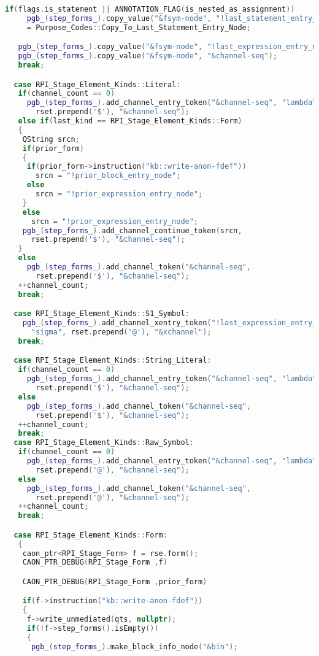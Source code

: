 \begin{lstlisting}[language = C++, numbers = none, escapechar = !,
    basicstyle = \ttfamily\bfseries\scriptsize, linewidth = .9\linewidth]
   if(flags.is_statement || ANNOTATION_FLAG(is_nested_as_assignment))
     pgb_(step_forms_).copy_value("&fsym-node", "!last_statement_entry_node")
     = Purpose_Codes::Copy_To_Last_Statement_Entry_Node;

   pgb_(step_forms_).copy_value("&fsym-node", "!last_expression_entry_node");
   pgb_(step_forms_).copy_value("&fsym-node", "&channel-seq");
   break;

  case RPI_Stage_Element_Kinds::Literal:
   if(channel_count == 0)
     pgb_(step_forms_).add_channel_entry_token("&channel-seq", "lambda",
       rset.prepend('$'), "&channel-seq");
   else if(last_kind == RPI_Stage_Element_Kinds::Form)
   {
    QString srcn;
    if(prior_form)
    {
     if(prior_form->instruction("kb::write-anon-fdef"))
       srcn = "!prior_block_entry_node";
     else
       srcn = "!prior_expression_entry_node";
    }
    else
      srcn = "!prior_expression_entry_node";
    pgb_(step_forms_).add_channel_continue_token(srcn,
      rset.prepend('$'), "&channel-seq");
   }
   else
     pgb_(step_forms_).add_channel_token("&channel-seq",
       rset.prepend('$'), "&channel-seq");
   ++channel_count;
   break;

  case RPI_Stage_Element_Kinds::S1_Symbol:
    pgb_(step_forms_).add_channel_xentry_token("!last_expression_entry_node",
      "sigma", rset.prepend('@'), "&xchannel");
   break;

  case RPI_Stage_Element_Kinds::String_Literal:
   if(channel_count == 0)
     pgb_(step_forms_).add_channel_entry_token("&channel-seq", "lambda",
       rset.prepend('$'), "&channel-seq");
   else
     pgb_(step_forms_).add_channel_token("&channel-seq",
       rset.prepend('$'), "&channel-seq");
   ++channel_count;
   break;
  case RPI_Stage_Element_Kinds::Raw_Symbol:
   if(channel_count == 0)
     pgb_(step_forms_).add_channel_entry_token("&channel-seq", "lambda",
       rset.prepend('@'), "&channel-seq");
   else
     pgb_(step_forms_).add_channel_token("&channel-seq",
       rset.prepend('@'), "&channel-seq");
   ++channel_count;
   break;

  case RPI_Stage_Element_Kinds::Form:
   {
    caon_ptr<RPI_Stage_Form> f = rse.form();
    CAON_PTR_DEBUG(RPI_Stage_Form ,f)

    CAON_PTR_DEBUG(RPI_Stage_Form ,prior_form)

    if(f->instruction("kb::write-anon-fdef"))
    {
     f->write_unmediated(qts, nullptr);
     if(!f->step_forms().isEmpty())
     {
      pgb_(step_forms_).make_block_info_node("&bin");


\end{lstlisting}
